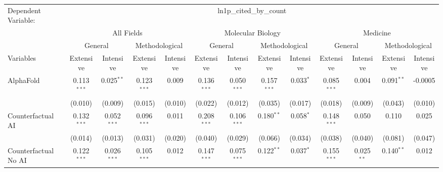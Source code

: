 \begingroup
\centering
\begin{tabular}{lcccccccccccc}
   \tabularnewline \midrule \midrule
   Dependent Variable: & \multicolumn{12}{c}{ln1p\_cited\_by\_count}\\
 & \multicolumn{4}{c}{All Fields} & \multicolumn{4}{c}{Molecular Biology} & \multicolumn{4}{c}{Medicine} \\
\cmidrule(lr){2-5} \cmidrule(lr){6-9} \cmidrule(lr){10-13}
 & \multicolumn{2}{c}{General} & \multicolumn{2}{c}{Methodological} & \multicolumn{2}{c}{General} & \multicolumn{2}{c}{Methodological} & \multicolumn{2}{c}{General} & \multicolumn{2}{c}{Methodological} \\
\cmidrule(lr){2-3} \cmidrule(lr){4-5} \cmidrule(lr){6-7} \cmidrule(lr){8-9} \cmidrule(lr){10-11} \cmidrule(lr){12-13}
Variables & \multicolumn{1}{c}{Extensive} & \multicolumn{1}{c}{Intensive} & \multicolumn{1}{c}{Extensive} & \multicolumn{1}{c}{Intensive} & \multicolumn{1}{c}{Extensive} & \multicolumn{1}{c}{Intensive} & \multicolumn{1}{c}{Extensive} & \multicolumn{1}{c}{Intensive} & \multicolumn{1}{c}{Extensive} & \multicolumn{1}{c}{Intensive} & \multicolumn{1}{c}{Extensive} & \multicolumn{1}{c}{Intensive} \\
\cmidrule(lr){1-1}\cmidrule(lr){2-2} \cmidrule(lr){3-3} \cmidrule(lr){4-4} \cmidrule(lr){5-5} \cmidrule(lr){6-6} \cmidrule(lr){7-7} \cmidrule(lr){8-8} \cmidrule(lr){9-9} \cmidrule(lr){10-10} \cmidrule(lr){11-11} \cmidrule(lr){12-12} \cmidrule(lr){13-13}
   AlphaFold                                & 0.113$^{***}$  & 0.025$^{**}$  & 0.123$^{***}$  & 0.009   & 0.136$^{***}$  & 0.050$^{***}$  & 0.157$^{***}$  & 0.033$^{*}$    & 0.085$^{***}$  & 0.004        & 0.091$^{**}$ & -0.0005\\   
                                            & (0.010)        & (0.009)       & (0.015)        & (0.010) & (0.022)        & (0.012)        & (0.035)        & (0.017)        & (0.018)        & (0.009)      & (0.043)      & (0.010)\\   
   Counterfactual AI                        & 0.132$^{***}$  & 0.052$^{***}$ & 0.096$^{***}$  & 0.011   & 0.208$^{***}$  & 0.106$^{***}$  & 0.180$^{**}$   & 0.058$^{*}$    & 0.148$^{***}$  & 0.050        & 0.110        & 0.025\\   
                                            & (0.014)        & (0.013)       & (0.031)        & (0.020) & (0.040)        & (0.029)        & (0.066)        & (0.034)        & (0.038)        & (0.040)      & (0.081)      & (0.047)\\   
   Counterfactual No AI                     & 0.122$^{***}$  & 0.026$^{***}$ & 0.105$^{***}$  & 0.012   & 0.147$^{***}$  & 0.075$^{***}$  & 0.122$^{**}$   & 0.037$^{*}$    & 0.155$^{***}$  & 0.025$^{**}$ & 0.140$^{**}$ & 0.012\\   

\end{tabular}
